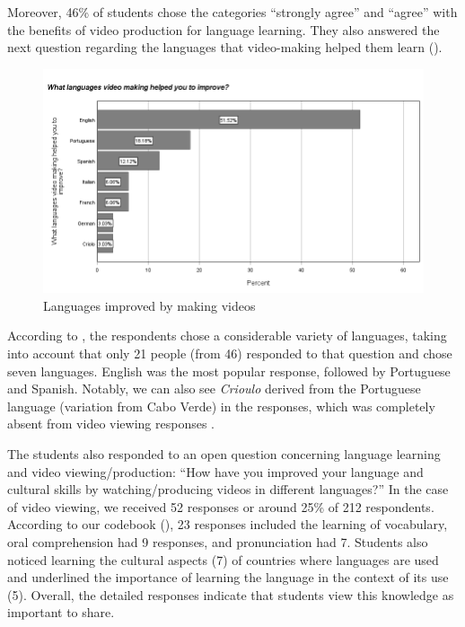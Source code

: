 Moreover, 46\% of students chose the categories ``strongly agree'' and
``agree'' with the benefits of video production for language learning.
They also answered the next question regarding the languages that
video-making helped them learn ().

\begin{figure}[htbp]
\centering
\begin{minipage}{\textwidth}
\includegraphics[width=\textwidth]{Fig-5.png}
\caption{Languages improved by making videos}
\label{fig-05}
\end{minipage}
\end{figure}

According to , the respondents chose a considerable variety of
languages, taking into account that only 21 people (from 46) responded
to that question and chose seven languages. English was the most popular
response, followed by Portuguese and Spanish. Notably, we can also see
\emph{Crioulo} derived from the Portuguese language (variation from Cabo
Verde) in the responses, which was completely absent from video viewing
responses \cite{shafirova2023}.

The students also responded to an open question concerning language
learning and video viewing/production: ``How have you improved your
language and cultural skills by watching/producing videos in different
languages?'' In the case of video viewing, we received 52 responses or
around 25\% of 212 respondents. According to our codebook (), 23
responses included the learning of vocabulary, oral comprehension had 9
responses, and pronunciation had 7. Students also noticed learning the
cultural aspects (7) of countries where languages are used and
underlined the importance of learning the language in the context of its
use (5). Overall, the detailed responses indicate that students view
this knowledge as important to share.

